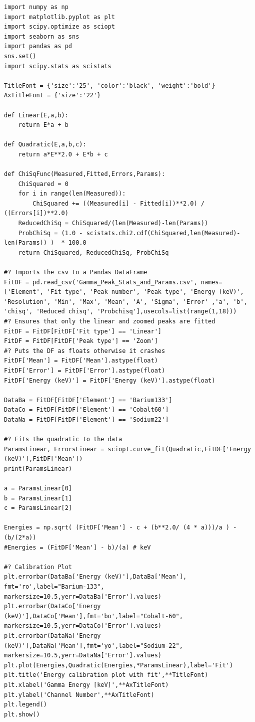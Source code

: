 \documentclass[11pt,a4paper]{article}
\begin{document}
\begin{verbatim}
import numpy as np
import matplotlib.pyplot as plt
import scipy.optimize as sciopt
import seaborn as sns
import pandas as pd
sns.set()
import scipy.stats as scistats

TitleFont = {'size':'25', 'color':'black', 'weight':'bold'} 
AxTitleFont = {'size':'22'}

def Linear(E,a,b):
    return E*a + b

def Quadratic(E,a,b,c):
    return a*E**2.0 + E*b + c

def ChiSqFunc(Measured,Fitted,Errors,Params):
    ChiSquared = 0
    for i in range(len(Measured)):
        ChiSquared += ((Measured[i] - Fitted[i])**2.0) / ((Errors[i])**2.0)
    ReducedChiSq = ChiSquared/(len(Measured)-len(Params))
    ProbChiSq = (1.0 - scistats.chi2.cdf(ChiSquared,len(Measured)-len(Params)) )  * 100.0
    return ChiSquared, ReducedChiSq, ProbChiSq

#? Imports the csv to a Pandas DataFrame
FitDF = pd.read_csv('Gamma_Peak_Stats_and_Params.csv', names=['Element', 'Fit type', 'Peak number',	'Peak type', 'Energy (keV)', 'Resolution', 'Min', 'Max', 'Mean', 'A', 'Sigma', 'Error' ,'a', 'b', 'chisq', 'Reduced chisq', 'Probchisq'],usecols=list(range(1,18)))
#? Ensures that only the linear and zoomed peaks are fitted
FitDF = FitDF[FitDF['Fit type'] == 'Linear']
FitDF = FitDF[FitDF['Peak type'] == 'Zoom']
#? Puts the DF as floats otherwise it crashes
FitDF['Mean'] = FitDF['Mean'].astype(float)
FitDF['Error'] = FitDF['Error'].astype(float)
FitDF['Energy (keV)'] = FitDF['Energy (keV)'].astype(float)

DataBa = FitDF[FitDF['Element'] == 'Barium133']
DataCo = FitDF[FitDF['Element'] == 'Cobalt60']
DataNa = FitDF[FitDF['Element'] == 'Sodium22']

#? Fits the quadratic to the data
ParamsLinear, ErrorsLinear = sciopt.curve_fit(Quadratic,FitDF['Energy (keV)'],FitDF['Mean'])
print(ParamsLinear)

a = ParamsLinear[0]
b = ParamsLinear[1]
c = ParamsLinear[2]

Energies = np.sqrt( (FitDF['Mean'] - c + (b**2.0/ (4 * a)))/a ) - (b/(2*a))
#Energies = (FitDF['Mean'] - b)/(a) # keV

#? Calibration Plot
plt.errorbar(DataBa['Energy (keV)'],DataBa['Mean'], fmt='ro',label="Barium-133", markersize=10.5,yerr=DataBa['Error'].values)
plt.errorbar(DataCo['Energy (keV)'],DataCo['Mean'],fmt='bo',label="Cobalt-60", markersize=10.5,yerr=DataCo['Error'].values)
plt.errorbar(DataNa['Energy (keV)'],DataNa['Mean'],fmt='yo',label="Sodium-22", markersize=10.5,yerr=DataNa['Error'].values)
plt.plot(Energies,Quadratic(Energies,*ParamsLinear),label='Fit')
plt.title('Energy calibration plot with fit',**TitleFont)
plt.xlabel('Gamma Energy [keV]',**AxTitleFont)
plt.ylabel('Channel Number',**AxTitleFont)
plt.legend()
plt.show()


\end{verbatim}
\end{document}
